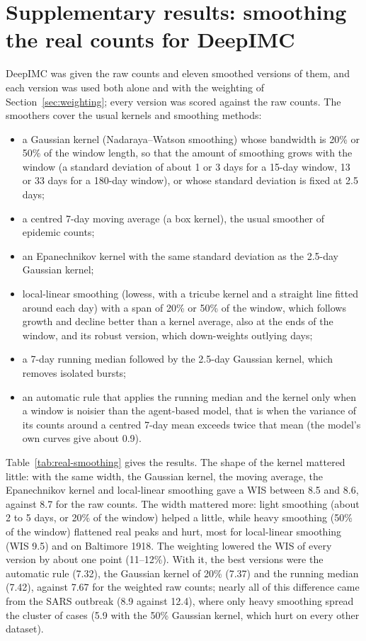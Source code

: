 \documentclass[12pt]{article}
\begin{document}
\section{Supplementary results: smoothing the real counts for DeepIMC}\label{app:smoothing}

DeepIMC was given the raw counts and eleven smoothed versions of them, and each version was used both alone and
with the weighting of Section~\ref{sec:weighting}; every version was scored against the raw counts. The smoothers
cover the usual kernels and smoothing methods:
\begin{itemize}[leftmargin=*]
\item a Gaussian kernel (Nadaraya--Watson smoothing) whose bandwidth is 20\% or 50\% of the window length, so that
the amount of smoothing grows with the window (a standard deviation of about 1 or 3 days for a 15-day window, 13
or 33 days for a 180-day window), or whose standard deviation is fixed at 2.5 days;
\item a centred 7-day moving average (a box kernel), the usual smoother of epidemic counts;
\item an Epanechnikov kernel with the same standard deviation as the 2.5-day Gaussian kernel;
\item local-linear smoothing (lowess, with a tricube kernel and a straight line fitted around each day) with a span
of 20\% or 50\% of the window, which follows growth and decline better than a kernel average, also at the ends
of the window, and its robust version, which down-weights outlying days;
\item a 7-day running median followed by the 2.5-day Gaussian kernel, which removes isolated bursts;
\item an automatic rule that applies the running median and the kernel only when a window is noisier than the
agent-based model, that is when the variance of its counts around a centred 7-day mean exceeds twice that mean
(the model's own curves give about 0.9).
\end{itemize}

Table~\ref{tab:real-smoothing} gives the results. The shape of the kernel mattered little: with the same width,
the Gaussian kernel, the moving average, the Epanechnikov kernel and local-linear smoothing gave a WIS between 8.5
and 8.6, against 8.7 for the raw counts. The width mattered more: light smoothing (about 2 to 5 days, or 20\% of the
window) helped a little, while heavy smoothing (50\% of the window) flattened real peaks and hurt, most for
local-linear smoothing (WIS 9.5) and on Baltimore 1918. The weighting lowered the WIS of every version by about
one point (11--12\%). With it, the best versions were the automatic rule (7.32), the Gaussian kernel of 20\% (7.37)
and the running median (7.42), against 7.67 for the weighted raw counts; nearly all of this difference came from
the SARS outbreak (8.9 against 12.4), where only heavy smoothing spread the cluster of cases (5.9 with the 50\%
Gaussian kernel, which hurt on every other dataset).
\end{document}
